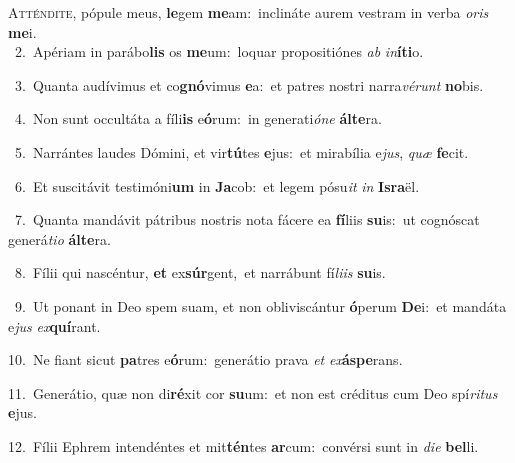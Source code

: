 \lettrine{\initial\textcolor{\initialcolor}{A}}{tténdite,} pópule meus, \textbf{le}\-gem \textbf{me}\-am:~\star inclináte aurem vestram in verba \textit{o}\-\textit{ris} \textbf{me}\-i.\\
{\numbfont\textcolor{\numbcolor}{~2.}}~Apériam in parábo\textbf{lis} os \textbf{me}\-um:~\star loquar propositiónes \textit{ab} \textit{in}\-\textbf{í}\textbf{ti}o.\par
{\numbfont\textcolor{\numbcolor}{~3.}}~Quanta audívimus et co\-\textbf{gnó}\-vimus \textbf{e}\-a:~\star et patres nostri narra\-\textit{vé}\-\textit{runt} \textbf{no}\-bis.\par
{\numbfont\textcolor{\numbcolor}{~4.}}~Non sunt occultáta a fíli\textbf{is} e\-\textbf{ó}\-rum:~\star in generati\-\textit{ó}\-\textit{ne} \textbf{ál}\-\textbf{te}ra.\par
{\numbfont\textcolor{\numbcolor}{~5.}}~Narrántes laudes Dómini, et vir\-\textbf{tú}\-tes \textbf{e}\-jus:~\star et mirabília e\-\textit{jus}\-, \textit{quæ} \textbf{fe}\-cit.\par
{\numbfont\textcolor{\numbcolor}{~6.}}~Et suscitávit testimóni\textbf{um} in \textbf{Ja}\-cob:~\star et legem pósu\textit{it} \textit{in} \textbf{Is}\-\textbf{ra}ël.\par
{\numbfont\textcolor{\numbcolor}{~7.}}~Quanta mandávit pátribus nostris nota fácere ea \textbf{fí}\-liis \textbf{su}\-is:~\star ut cognóscat generá\-\textit{ti}\-\textit{o} \textbf{ál}\-\textbf{te}ra.\par
{\numbfont\textcolor{\numbcolor}{~8.}}~Fílii qui nascéntur, \textbf{et} ex\-\textbf{súr}\-gent,~\star et narrábunt fí\-\textit{li}\-\textit{is} \textbf{su}\-is.\par
{\numbfont\textcolor{\numbcolor}{~9.}}~Ut ponant in Deo spem suam, et non obliviscántur \textbf{ó}\-perum \textbf{De}\-i:~\star et mandáta e\textit{jus} \textit{ex}\-\textbf{quí}rant.\par
{\numbfont\textcolor{\numbcolor}{10.}}~Ne fiant sicut \textbf{pa}\-tres e\-\textbf{ó}\-rum:~\star generátio prava \textit{et} \textit{ex}\-\textbf{ás}\textbf{pe}rans.\par
{\numbfont\textcolor{\numbcolor}{11.}}~Generátio, quæ non di\-\textbf{ré}\-xit cor \textbf{su}\-um:~\star et non est créditus cum Deo spí\-\textit{ri}\-\textit{tus} \textbf{e}\-jus.\par
{\numbfont\textcolor{\numbcolor}{12.}}~Fílii Ephrem intendéntes et mit\-\textbf{tén}\-tes \textbf{ar}\-cum:~\star convérsi sunt in \textit{di}\-\textit{e} \textbf{bel}\-li.\par
